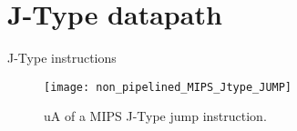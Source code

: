 \section{J-Type datapath}
% 
\begin{frame}{J-Type instructions}
  \begin{figure}
  \centering
  \texttt{[image: non\_pipelined\_MIPS\_Jtype\_JUMP]}
  \vspace{-3pt}
  \caption{\ac{uA} of a \ac{MIPS} J-Type jump instruction.}
  \label{Figure:non_pipelined_MIPS_Jtype_JUMP}
  \end{figure}
\end{frame}